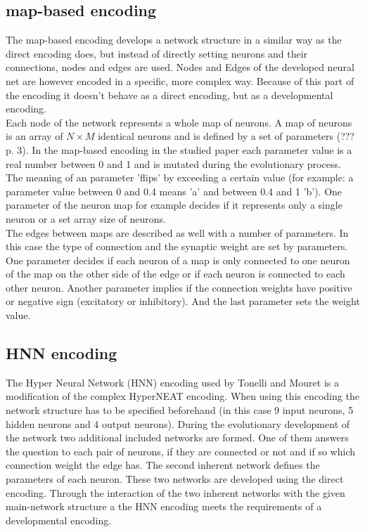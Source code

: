 \documentclass[12pt,twoside]{article}
\theoremstyle{plain}
\theoremstyle{definition}
\theoremstyle{remark}
\begin{document}
\subsection{map-based encoding}
The map-based encoding develops a network structure in a similar way as the direct encoding does, but instead of directly setting neurons and their connections, nodes and edges are used.
Nodes and Edges of the developed neural net are however encoded in a specific, more complex way. Because of this part of the encoding it doesn't behave as a direct encoding, but as a developmental encoding.\\
Each node of the network represents a whole map of neurons. A map of neurons is an array of $N \times M$ identical neurons and is defined by a set of parameters (??? \cite{tonelli2011using} p. 3). 
In the map-based encoding in the studied paper each parameter value is a real number between 0 and 1 and is mutated during the evolutionary process.
The meaning of an parameter 'flips' by exceeding a certain value (for example: a parameter value between 0 and 0.4 means 'a' and between 0.4 and 1 'b').
One parameter of the neuron map for example decides if it represents only a single neuron or a set array size of neurons.\\
The edges between maps are described as well with a number of parameters.
In this case the type of connection and the synaptic weight are set by parameters.
One parameter decides if each neuron of a map is only connected to one neuron of the map on the other side of the edge or if each neuron is connected to each other neuron.
Another parameter implies if the connection weights have positive or negative sign (excitatory or inhibitory). And the last parameter sets the weight value.

\subsection{HNN encoding}
The Hyper Neural Network (HNN) encoding used by Tonelli and Mouret is a modification of the complex HyperNEAT encoding.
When using this encoding the network structure has to be specified beforehand (in this case 9 input neurons, 5 hidden neurons and 4 output neurons).
During the evolutionary development of the network two additional included networks are formed. One of them answers the question to each pair of neurons, if they are connected or not and if so which connection weight the edge has.
The second inherent network defines the parameters of each neuron. These two networks are developed using the direct encoding.
Through the interaction of the two inherent networks with the given main-network structure a the HNN encoding meets the requirements of a developmental encoding.
\end{document}

